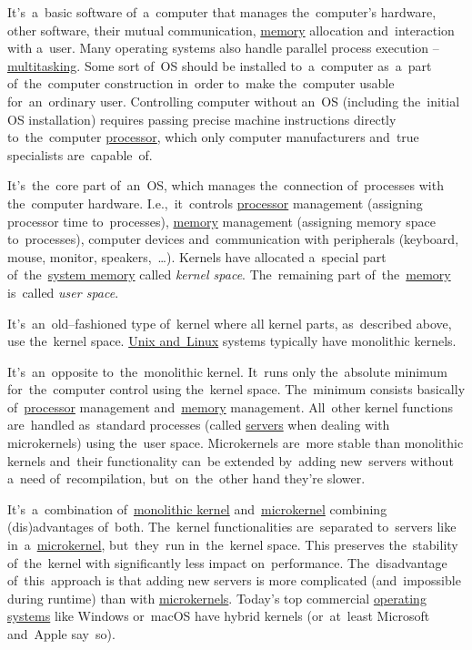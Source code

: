 \label{os}
It's~a~basic software of~a~computer that manages the~computer's hardware, other software, their mutual communication, \hyperref[systemmemory]{memory} allocation and~interaction with a~user.
Many operating systems also handle parallel process execution -- \hyperref[multitasking]{multitasking}.
Some sort of~OS should be installed to~a~computer as~a~part of~the~computer construction in~order to~make the~computer usable for~an~ordinary user.
Controlling computer without an~OS (including the~initial OS installation) requires passing precise machine instructions directly to~the~computer \hyperref[processorcpucore]{processor}, which only computer manufacturers and~true specialists are~capable~of.

\label{kernel}
It's~the~core part of~an~OS, which manages the~connection of~processes with the~computer hardware.
I.e.,~it~controls \hyperref[processorcpucore]{processor} management (assigning processor time to~processes), \hyperref[systemmemory]{memory} management (assigning memory space to~processes), computer devices and~communication with peripherals (keyboard, mouse, monitor, speakers,~\dots).
Kernels have allocated a~special part of~the~\hyperref[systemmemory]{system memory} called \textit{kernel space}.
The~remaining part of~the~\hyperref[systemmemory]{memory} is~called \textit{user space}.

\label{monolithickernel}
It's~an~old--fashioned type of~kernel where all kernel parts, as~described above, use the~kernel space.
\hyperref[unixlinux]{Unix and~Linux} systems typically have monolithic kernels.

\label{microkernel}
It's~an~opposite to~the~monolithic kernel.
It~runs only the~absolute minimum for~the~computer control using the~kernel space.
The~minimum consists basically of~\hyperref[processorcpucore]{processor} management and~\hyperref[systemmemory]{memory} management.
All~other kernel functions are~handled as~standard processes (called \hyperref[server]{servers} when dealing with microkernels) using the~user space.
Microkernels are~more stable than monolithic kernels and~their functionality can~be extended by~adding new~servers without a~need of~recompilation, but~on~the~other hand they're slower.

\label{hybridkernel}
It's~a~combination of~\hyperref[monolithickernel]{monolithic kernel} and~\hyperref[microkernel]{microkernel} combining (dis)advantages of~both.
The~kernel functionalities are~separated to~servers like in~a~\hyperref[microkernel]{microkernel}, but~they~run in~the~kernel space.
This preserves the~stability of~the~kernel with significantly less impact on~performance.
The~disadvantage of~this~approach is that adding new servers is more complicated (and~impossible during runtime) than with \hyperref[microkernel]{microkernels}.
Today's top commercial \hyperref[os]{operating systems} like Windows or~macOS have hybrid kernels (or~at~least Microsoft and~Apple say~so).
